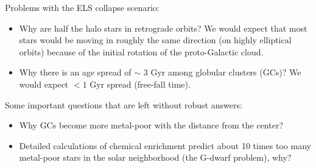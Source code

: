 \documentclass[letterpaper,landscape]{slides}
\begin{document}


\begin{slide}
{\color{red} Problems with the ELS collapse scenario:}
\vskip -0.5in
\begin{itemize}
      \item {\color{blue} Why are half the halo stars in retrograde orbits?} We would
        expect that most stars would be moving in roughly the same direction (on highly
        elliptical orbits) because of the initial rotation of the proto-Galactic cloud.
      \item {\color{blue} Why there is an age spread of $\sim$ 3 Gyr among globular clusters (GCs)?} 
        We would expect $<1$ Gyr spread (free-fall time).
\end{itemize}
{\color{red} Some important questions that are left without robust answers:}
\vskip -0.5in
\begin{itemize}
      \item {\color{blue} Why GCs become more metal-poor with the distance from the center?}
      \item{\color{blue}  Detailed calculations of chemical enrichment predict about 10 times
                          too many metal-poor stars in the solar neighborhood (the G-dwarf problem), why?}
\end{itemize}
\vfill
\end{slide}

\end{document}
